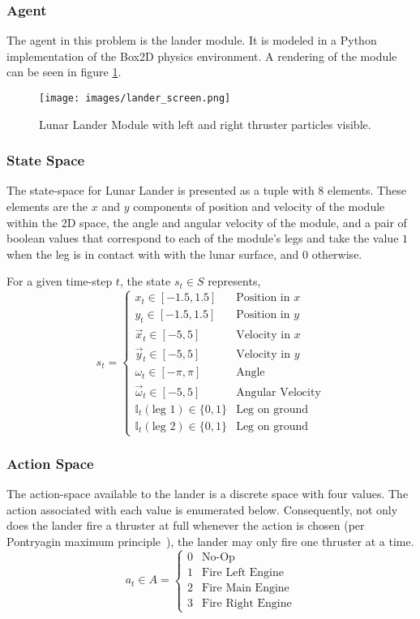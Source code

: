 \documentclass[journal]{IEEEtran}
\begin{document}
\subsubsection{Agent}
The agent in this problem is the lander module. It is modeled in a Python implementation of
the Box2D physics environment. A rendering of the module can be seen in figure \ref{fig:lander}.

\begin{figure}
    \center
    \texttt{[image: images/lander\_screen.png]}
    \caption{Lunar Lander Module with left and right thruster particles visible.}
    \label{fig:lander}
\end{figure}

\subsubsection{State Space}
The state-space for Lunar Lander is presented as a tuple with 8 elements.
These elements are the \(x\) and \(y\) components of position and velocity of the module within
the 2D space, the angle and angular velocity of the module, and a pair of boolean values that 
correspond to each of the module's legs and take the value \(1\) when the leg is in contact with
with the lunar surface, and \(0\) otherwise.

For a given time-step \(t\), the state \(s_t \in S\) represents,
\[s_t = \begin{cases}
    x_t \in [-1.5,1.5]   & \text{Position in } x \\
    y_t \in [-1.5,1.5]   & \text{Position in } y \\
    \vec{x}_t \in [-5,5] & \text{Velocity in } x \\
    \vec{y}_t \in [-5,5] & \text{Velocity in } y \\
    \omega_t \in [-\pi,\pi] & \text{Angle}\\
    \vec{\omega}_t \in [-5,5] & \text{Angular Velocity}\\
    \mathbb{I}_{t}(\text{leg 1}) \in\{0,1\} & \text{Leg on ground}\\
    \mathbb{I}_{t}(\text{leg 2}) \in\{0,1\} & \text{Leg on ground}
\end{cases}\]

\subsubsection{Action Space}
The action-space available to the lander is a discrete space with four values.
The action associated with each value is enumerated below. 
Consequently, not only does the lander fire a thruster at full whenever the action is chosen 
(per Pontryagin maximum principle~\cite{kaufman1964}),
the lander may only fire one thruster at a time.
\[a_t \in A = 
    \begin{cases}
        0 & \text{No-Op} \\
        1 & \text{Fire Left Engine} \\
        2 & \text{Fire Main Engine} \\
        3 & \text{Fire Right Engine}
    \end{cases}
\]
\end{document}
